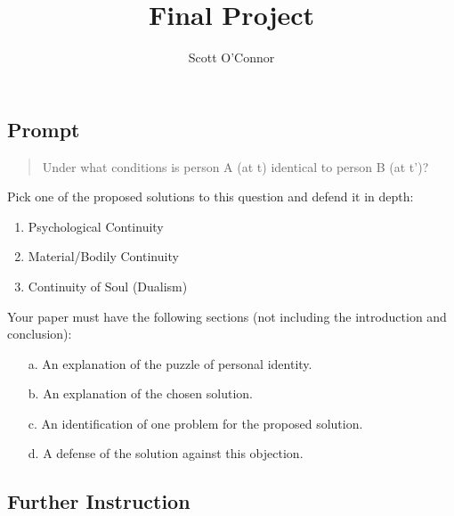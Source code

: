 \documentclass[10pt]{article}
\title{Final Project}
\author{Scott O’Connor}
\providecommand{\tightlist}{%
  \setlength{\itemsep}{0pt}\setlength{\parskip}{0pt}}
\begin{document}
\maketitle

\subsection{Prompt}\label{prompt}

\begin{quote}
Under what conditions is person A (at t) identical to person B (at t')?
\end{quote}

Pick one of the proposed solutions to this question and defend it in
depth:

\begin{enumerate}
\def\labelenumi{\arabic{enumi}.}
\tightlist
\item
  Psychological Continuity
\item
  Material/Bodily Continuity
\item
  Continuity of Soul (Dualism)
\end{enumerate}

Your paper must have the following sections (not including the
introduction and conclusion):

\begin{enumerate}
\tightlist
\item[a.] An explanation of the puzzle of personal identity.
\item[b.] An explanation of the chosen solution.
\item[c.] An identification of one problem for the proposed solution.
\item[d.] A defense of the solution against this objection.
\end{enumerate}

\subsection{Further Instruction}\label{further-instruction}
\end{document}
